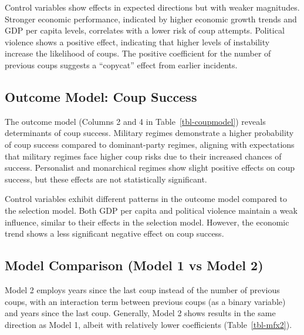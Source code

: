 \documentclass[
  12pt,
]{report}
\begin{document}
Control variables show effects in expected directions but with weaker
magnitudes. Stronger economic performance, indicated by higher economic
growth trends and GDP per capita levels, correlates with a lower risk of
coup attempts. Political violence shows a positive effect, indicating
that higher levels of instability increase the likelihood of coups. The
positive coefficient for the number of previous coups suggests a
``copycat'' effect from earlier incidents.

\subsection{Outcome Model: Coup
Success}\label{outcome-model-coup-success}

The outcome model (Columns 2 and 4 in Table~\ref{tbl-coupmodel}) reveals
determinants of coup success. Military regimes demonstrate a higher
probability of coup success compared to dominant-party regimes, aligning
with expectations that military regimes face higher coup risks due to
their increased chances of success. Personalist and monarchical regimes
show slight positive effects on coup success, but these effects are not
statistically significant.

Control variables exhibit different patterns in the outcome model
compared to the selection model. Both GDP per capita and political
violence maintain a weak influence, similar to their effects in the
selection model. However, the economic trend shows a less significant
negative effect on coup success.

\subsection{Model Comparison (Model 1 vs Model
2)}\label{model-comparison-model-1-vs-model-2}

Model 2 employs years since the last coup instead of the number of
previous coups, with an interaction term between previous coups (as a
binary variable) and years since the last coup. Generally, Model 2 shows
results in the same direction as Model 1, albeit with relatively lower
coefficients (Table~\ref{tbl-mfx2}).

\begingroup
\setlength{}
\setlength{}\fontsize{12.0pt}{14.4pt}\selectfont
\setlength{\LTpost}{0mm}
\end{document}
